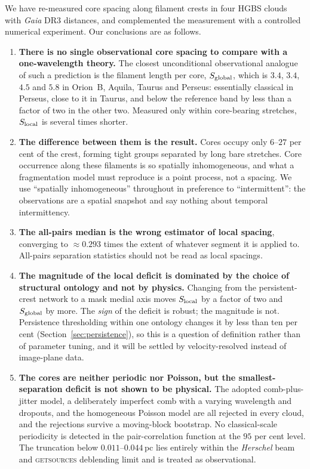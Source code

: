 \documentclass[usenatbib,twoside,twocolumn]{mnras}
\begin{document}
We have re-measured core spacing along filament crests in four HGBS clouds with \textit{Gaia} DR3 distances, and complemented the measurement with a controlled numerical experiment. Our conclusions are as follows.

\begin{enumerate}\setlength{\itemsep}{2pt}
\item \textbf{There is no single observational core spacing to compare with a one-wavelength theory.} The closest unconditional observational analogue of such a prediction is the filament length per core, $S_{\rm global}$, which is $3.4$, $3.4$, $4.5$ and $5.8$ in Orion~B, Aquila, Taurus and Perseus: essentially classical in Perseus, close to it in Taurus, and below the reference band by less than a factor of two in the other two. Measured only within core-bearing stretches, $S_{\rm local}$ is several times shorter.
\item \textbf{The difference between them is the result.} Cores occupy only $6$--$27$ per cent of the crest, forming tight groups separated by long bare stretches. Core occurrence along these filaments is so spatially inhomogeneous, and what a fragmentation model must reproduce is a point process, not a spacing. We use ``spatially inhomogeneous'' throughout in preference to ``intermittent'': the observations are a spatial snapshot and say nothing about temporal intermittency.
\item \textbf{The all-pairs median is the wrong estimator of local spacing}, converging to $\approx0.293$ times the extent of whatever segment it is applied to. All-pairs separation statistics should not be read as local spacings.
\item \textbf{The magnitude of the local deficit is dominated by the choice of structural ontology and not by physics.} Changing from the persistent-crest network to a mask medial axis moves $S_{\rm local}$ by a factor of two and $S_{\rm global}$ by more. The \emph{sign} of the deficit is robust; the magnitude is not. Persistence thresholding within one ontology changes it by less than ten per cent (Section~\ref{sec:persistence}), so this is a question of definition rather than of parameter tuning, and it will be settled by velocity-resolved  instead of image-plane data.
\item \textbf{The cores are neither periodic nor Poisson, but the smallest-separation deficit is not shown to be physical.} The adopted comb-plus-jitter model, a deliberately imperfect comb with a varying wavelength and dropouts, and the homogeneous Poisson model are all rejected in every cloud, and the rejections survive a moving-block bootstrap. No classical-scale periodicity is detected in the pair-correlation function at the $95$ per cent level. The truncation below $0.011$--$0.044$\,pc lies entirely within the \textit{Herschel} beam and \textsc{getsources} deblending limit and is treated as observational.

\end{enumerate}
\end{document}
